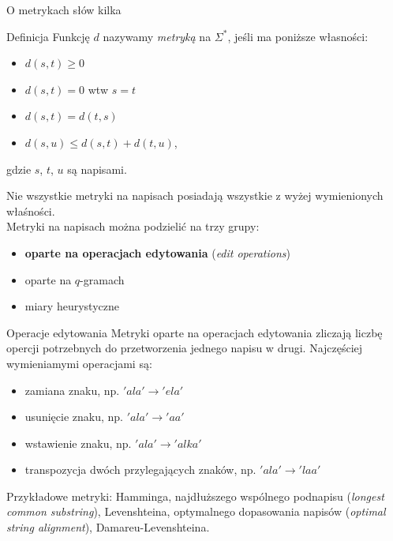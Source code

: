 \documentclass[11pt,pdftex,mathserif]{beamer}\usepackage[]{graphicx}\usepackage[]{color}
\theoremstyle{definition}
\begin{document}
\begin{frame}{O metrykach słów kilka}
\begin{block}{Definicja}
Funkcję $d$ nazywamy \emph{metryką} na $\Sigma^*$, jeśli ma poniższe własności:
\begin{itemize}
\item $d(s,t) \geq 0$
\item $d(s,t) = 0$ wtw $s = t$
\item $d(s,t) = d(t,s)$
\item $d(s,u) \leq d(s,t) + d(t,u)$,
\end{itemize}
gdzie $s$, $t$, $u$ są napisami.
\end{block}
Nie wszystkie metryki na napisach posiadają wszystkie z wyżej wymienionych właśności.\\
Metryki na napisach można podzielić na trzy grupy:
\begin{itemize}
\item \textbf{oparte na operacjach edytowania} (\emph{edit operations})
\item oparte na $q$-gramach
\item miary heurystyczne
\end{itemize}
\end{frame}


\begin{frame}{Operacje edytowania}
Metryki oparte na operacjach edytowania zliczają liczbę opercji potrzebnych do przetworzenia jednego napisu w drugi. Najczęściej wymieniamymi operacjami są:
\begin{itemize}
\item zamiana znaku, np. $'ala' \rightarrow 'ela'$
\item usunięcie znaku, np. $'ala' \rightarrow 'aa'$
\item wstawienie znaku, np. $'ala' \rightarrow 'alka'$
\item transpozycja dwóch przylegających znaków, np. $'ala' \rightarrow 'laa'$
\end{itemize}

Przykładowe metryki: Hamminga, najdłuższego wspólnego podnapisu (\emph{longest common substring}), Levenshteina, optymalnego dopasowania napisów (\emph{optimal string alignment}), Damareu-Levenshteina.

\end{frame}
\end{document}
